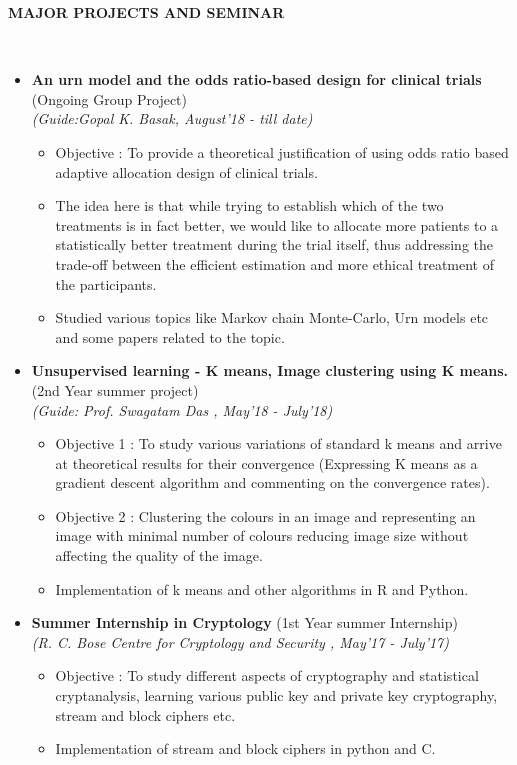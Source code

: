 \documentclass[a4paper,10pt]{article}
\newcommand{\isep}{-2 pt}
\newcommand{\lsep}{-0.5cm}
\newcommand{\resheading}[1]{{\small \colorbox{mygrey}{\begin{minipage}{0.975\textwidth}{\textbf{#1 \vphantom{p\^{E}}}}\end{minipage}}}}
\begin{document}
\resheading{\textbf{MAJOR PROJECTS AND SEMINAR} }\\[\lsep]
\begin{itemize}
\item \textbf{An urn model and the odds ratio-based design
for clinical trials} (Ongoing Group Project) \\
 \emph{(Guide:Gopal K. Basak, August'18 - till date)} \\[-0.6cm]
	\begin{itemize}\itemsep \isep
	\item Objective : To provide a theoretical justification of using odds ratio based adaptive allocation design of clinical trials.
	\item The idea here is that while trying to establish which of the two treatments is in fact better, we would like to allocate more patients to a statistically better treatment during the trial itself, thus addressing the trade-off between the efficient estimation and more ethical treatment of the participants.

	\item Studied various topics like Markov chain Monte-Carlo, Urn models etc and some papers related to the topic.
    \end{itemize}

\item \textbf{Unsupervised learning - K means, Image clustering using K means.
} (2nd Year summer project) \\
 \emph{(Guide: Prof. Swagatam Das
, May'18 - July'18)} \\[-0.6cm]
	\begin{itemize}\itemsep \isep
	\item Objective 1 : To study various variations of standard k means and arrive at theoretical results for their convergence (Expressing K means as a gradient descent algorithm and commenting on the convergence rates).
	\item Objective 2 : Clustering the colours in an image and representing an image with minimal number of colours reducing image size without affecting the quality of the image.
	\item Implementation of k means and other algorithms in R and Python.
	\end{itemize}

\item \textbf{Summer Internship in Cryptology }
(1st Year summer Internship) \\
 \emph{(R. C. Bose Centre for Cryptology and Security
, May'17 - July'17)} \\[-0.6cm]
	\begin{itemize}\itemsep \isep
	\item Objective : To study different aspects of cryptography and statistical cryptanalysis, learning various public key and private key cryptography, stream and block ciphers etc.
	\item Implementation of stream and block ciphers in python and C. 
	\end{itemize}


\end{itemize}
\end{document}
